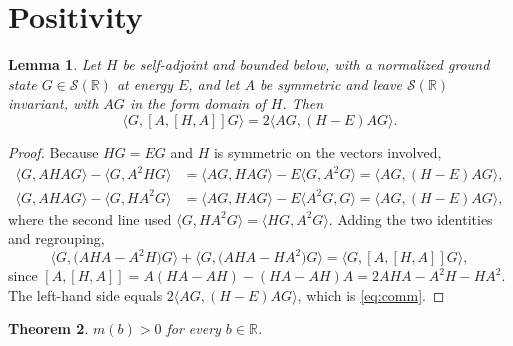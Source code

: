 \documentclass[11pt,reqno]{amsart}
\theoremstyle{plain}
\newtheorem{theorem}{Theorem}[section]
\newtheorem{lemma}[theorem]{Lemma}
\theoremstyle{definition}
\theoremstyle{remark}
\numberwithin{equation}{section}
\begin{document}
\section{Positivity}
\label{sec:positivity}

\begin{lemma}
  \label{lem:comm}
  Let $H$ be self-adjoint and bounded below, with a normalized ground state
  $G\in\mathcal S(\mathbb R)$ at energy $E$, and let $A$ be symmetric and leave
  $\mathcal S(\mathbb R)$ invariant, with $AG$ in the form domain of $H$. Then
  \begin{equation}
    \label{eq:comm}
    \langle G,[A,[H,A]]G\rangle=2\langle AG,(H-E)AG\rangle .
  \end{equation}
\end{lemma}

\begin{proof}
  Because $HG=EG$ and $H$ is symmetric on the vectors involved,
  \begin{align*}
    \langle G,A H A G\rangle-\langle G,A^2HG\rangle
      &=\langle AG,HAG\rangle-E\langle G,A^2G\rangle
       =\langle AG,(H-E)AG\rangle,\\
    \langle G,A H A G\rangle-\langle G,HA^2G\rangle
      &=\langle AG,HAG\rangle-E\langle A^2G,G\rangle
       =\langle AG,(H-E)AG\rangle,
  \end{align*}
  where the second line used $\langle G,HA^2G\rangle=\langle HG,A^2G\rangle$.
  Adding the two identities and regrouping,
  \begin{equation*}
    \langle G,\bigl(AHA-A^2H\bigr)G\rangle
    +\langle G,\bigl(AHA-HA^2\bigr)G\rangle
    =\langle G,[A,[H,A]]G\rangle,
  \end{equation*}
  since $[A,[H,A]]=A(HA-AH)-(HA-AH)A=2AHA-A^2H-HA^2$. The left-hand side
  equals $2\langle AG,(H-E)AG\rangle$, which is \eqref{eq:comm}.
\end{proof}

\begin{theorem}
  \label{thm:positivity}
  $m(b)>0$ for every $b\in\mathbb R$.
\end{theorem}
\end{document}
